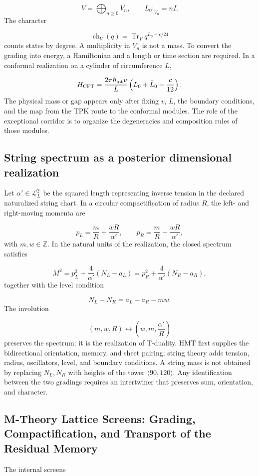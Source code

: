 \[
V=\bigoplus_{n\ge0}V_n,
\qquad
L_0|_{V_n}=nI.
\]
The character

\[
\operatorname{ch}_V(q)
=\operatorname{Tr}_V q^{L_0-c/24}
\]
counts states by degree. A multiplicity in \(V_n\) is not a mass. To
convert the grading into energy, a Hamiltonian and a length or time section
are required. In a conformal realization on a cylinder of circumference
\(L\),

\[
H_{\rm CFT}
=\frac{2\pi\hbar_{\rm int}v}{L}
\left(L_0+\bar L_0-\frac{c}{12}\right).
\]
The physical mass or gap appears only after fixing \(v\), \(L\), the boundary conditions, and the map from the TPK route to the conformal modules. The role of the exceptional corridor is to organize the degeneracies and composition rules of those modules.

\subsection{String spectrum as a posterior dimensional realization}
Let \(\alpha'\in\mathcal L_L^2\) be the squared length representing inverse tension in the declared naturalized string chart. In a circular compactification of radius \(R\), the left- and right-moving momenta are

\[
p_L=\frac{m}{R}+\frac{wR}{\alpha'},
\qquad
p_R=\frac{m}{R}-\frac{wR}{\alpha'},
\]
with \(m,w\in\mathbb Z\). In the natural units of the realization, the closed spectrum satisfies

\[
M^2=p_L^2+\frac{4}{\alpha'}(N_L-a_L)
=p_R^2+\frac{4}{\alpha'}(N_R-a_R),
\]
together with the level condition

\[
N_L-N_R=a_L-a_R-mw.
\]
The involution

\[
(m,w,R)\longleftrightarrow
\left(w,m,\frac{\alpha'}{R}\right)
\]
preserves the spectrum: it is the realization of T-duality. HMT first supplies the bidirectional orientation, memory, and sheet pairing; string theory adds tension, radius, oscillators, level, and boundary conditions. A string mass is not obtained by replacing \(N_L,N_R\) with heights of the tower \(\langle90,120\rangle\). Any identification between the two gradings requires an intertwiner that preserves sum, orientation, and character.

\subsection{M-Theory Lattice Screens: Grading, Compactification, and Transport of the Residual Memory}
The internal screens

